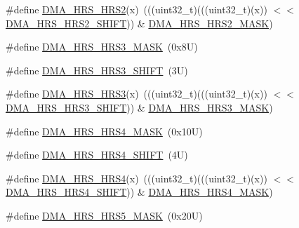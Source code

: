 \begin{DoxyCompactItemize}
\#define \mbox{\hyperlink{group___d_m_a___register___masks_gae814a212f214cf999ccc03f0f7a868e6}{D\+M\+A\+\_\+\+H\+R\+S\+\_\+\+H\+R\+S2}}(x)~(((uint32\+\_\+t)(((uint32\+\_\+t)(x)) $<$$<$ \mbox{\hyperlink{group___d_m_a___register___masks_ga5ce6312c610677e9fd618e58cf5db4be}{D\+M\+A\+\_\+\+H\+R\+S\+\_\+\+H\+R\+S2\+\_\+\+S\+H\+I\+FT}})) \& \mbox{\hyperlink{group___d_m_a___register___masks_gaab172f0aec10459f57a424abf8218201}{D\+M\+A\+\_\+\+H\+R\+S\+\_\+\+H\+R\+S2\+\_\+\+M\+A\+SK}})
\item 
\#define \mbox{\hyperlink{group___d_m_a___register___masks_gab38eb6178d982a70880d2540c8d21533}{D\+M\+A\+\_\+\+H\+R\+S\+\_\+\+H\+R\+S3\+\_\+\+M\+A\+SK}}~(0x8\+U)
\item 
\#define \mbox{\hyperlink{group___d_m_a___register___masks_ga354d385e3e760a2808ba5320f58a17e9}{D\+M\+A\+\_\+\+H\+R\+S\+\_\+\+H\+R\+S3\+\_\+\+S\+H\+I\+FT}}~(3\+U)
\item 
\#define \mbox{\hyperlink{group___d_m_a___register___masks_ga6b5552ec14f5867d89d80b22a4dc25f1}{D\+M\+A\+\_\+\+H\+R\+S\+\_\+\+H\+R\+S3}}(x)~(((uint32\+\_\+t)(((uint32\+\_\+t)(x)) $<$$<$ \mbox{\hyperlink{group___d_m_a___register___masks_ga354d385e3e760a2808ba5320f58a17e9}{D\+M\+A\+\_\+\+H\+R\+S\+\_\+\+H\+R\+S3\+\_\+\+S\+H\+I\+FT}})) \& \mbox{\hyperlink{group___d_m_a___register___masks_gab38eb6178d982a70880d2540c8d21533}{D\+M\+A\+\_\+\+H\+R\+S\+\_\+\+H\+R\+S3\+\_\+\+M\+A\+SK}})
\item 
\#define \mbox{\hyperlink{group___d_m_a___register___masks_ga79a7d99729d1515c973892e2ba70e448}{D\+M\+A\+\_\+\+H\+R\+S\+\_\+\+H\+R\+S4\+\_\+\+M\+A\+SK}}~(0x10\+U)
\item 
\#define \mbox{\hyperlink{group___d_m_a___register___masks_ga4268fab708cc31dc6f6cd138785be5f3}{D\+M\+A\+\_\+\+H\+R\+S\+\_\+\+H\+R\+S4\+\_\+\+S\+H\+I\+FT}}~(4\+U)
\item 
\#define \mbox{\hyperlink{group___d_m_a___register___masks_ga90248faf69617103792134ffd5fd6f6d}{D\+M\+A\+\_\+\+H\+R\+S\+\_\+\+H\+R\+S4}}(x)~(((uint32\+\_\+t)(((uint32\+\_\+t)(x)) $<$$<$ \mbox{\hyperlink{group___d_m_a___register___masks_ga4268fab708cc31dc6f6cd138785be5f3}{D\+M\+A\+\_\+\+H\+R\+S\+\_\+\+H\+R\+S4\+\_\+\+S\+H\+I\+FT}})) \& \mbox{\hyperlink{group___d_m_a___register___masks_ga79a7d99729d1515c973892e2ba70e448}{D\+M\+A\+\_\+\+H\+R\+S\+\_\+\+H\+R\+S4\+\_\+\+M\+A\+SK}})
\item 
\#define \mbox{\hyperlink{group___d_m_a___register___masks_gacfc3b3c3d28ca9bfefaa6709e9909508}{D\+M\+A\+\_\+\+H\+R\+S\+\_\+\+H\+R\+S5\+\_\+\+M\+A\+SK}}~(0x20\+U)
\item 
$$
\end{DoxyCompactItemize}
